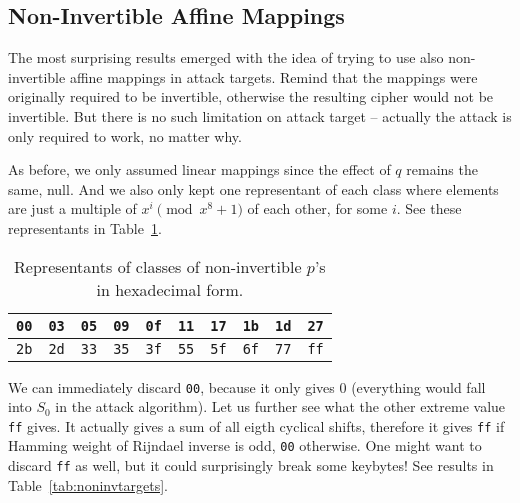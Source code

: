 
\subsection{Non-Invertible Affine Mappings}

The most surprising results emerged with the idea of trying to use also non-invertible affine mappings in attack targets. Remind that the mappings were originally required to be invertible, otherwise the resulting cipher would not be invertible. But there is no such limitation on attack target -- actually the attack is only required to work, no matter why.

As before, we only assumed linear mappings since the effect of $q$ remains the same, null. And we also only kept one representant of each class where elements are just a multiple of $x^i\pmod{x^8+1}$ of each other, for some $i$. See these representants in Table~\ref{tab:classreprenoninv}.

\begin{table}[h]
	\begin{center}
	\begin{tabular}{| c | c | c | c | c | c | c | c | c | c |}
		\hline
		{\tt 00} & {\tt 03} & {\tt 05} & {\tt 09} & {\tt 0f} & {\tt 11} & {\tt 17} & {\tt 1b} & {\tt 1d} & {\tt 27} \\
		\hline
		{\tt 2b} & {\tt 2d} & {\tt 33} & {\tt 35} & {\tt 3f} & {\tt 55} & {\tt 5f} & {\tt 6f} & {\tt 77} & {\tt ff} \\
		\hline
	\end{tabular}
	\end{center}
\caption{Representants of classes of non-invertible $p$'s in hexadecimal form.}
\label{tab:classreprenoninv}
\end{table}

We can immediately discard {\tt 00}, because it only gives $0$ (everything would fall into $S_0$ in the attack algorithm). Let us further see what the other extreme value {\tt ff} gives. It actually gives a sum of all eigth cyclical shifts, therefore it gives {\tt ff} if Hamming weight of Rijndael inverse is odd, {\tt 00} otherwise. One might want to discard {\tt ff} as well, but it could surprisingly break some keybytes! See results in Table~\ref{tab:noninvtargets}.

